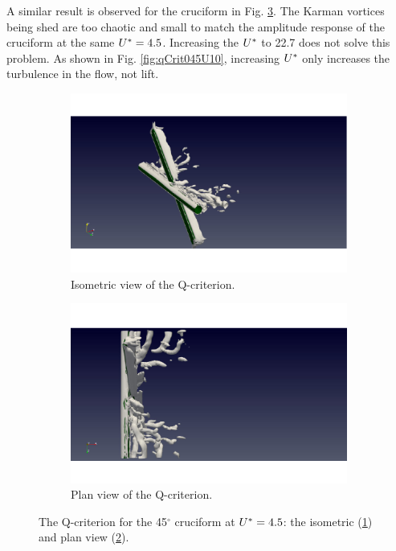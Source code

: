 \documentclass[oneside]{utmthesis}
\begin{document}
A similar result is observed for the \angth{} cruciform in Fig. \ref{fig:qCrit045U02}. The Karman vortices being shed are too chaotic and small to match the amplitude response of the \angfo{} cruciform at the same $U^{*}=4.5$. Increasing the $U^{*}$ to 22.7 does not solve this problem. As shown in Fig. \ref{fig:qCrit045U10}, increasing $U^{*}$ only increases the turbulence in the flow, not lift.

\begin{figure}[H]
  \centering
  \begin{subfigure}[h]{0.48\textwidth}
    \includegraphics[width=\textwidth,trim={1.5cm 0 3cm 0},clip]{figs/qIso045U02}
    \caption{Isometric view of the Q-criterion.}
    \label{fig:qIso045U02}
  \end{subfigure}
  \hfill
  \begin{subfigure}[h]{0.48\textwidth}
    \includegraphics[width=\textwidth,trim={1.5cm 0 3cm 0},clip]{figs/qTop045U02}
    \caption{Plan view of the Q-criterion.}
    \label{fig:qTop045U02}
  \end{subfigure}

  \caption{The Q-criterion for the 45$^{\circ}$ cruciform at $U^{*} = 4.5$: the isometric (\ref{fig:qIso045U02}) and plan view (\ref{fig:qTop045U02}).} \label{fig:qCrit045U02}
\end{figure}
\end{document}
